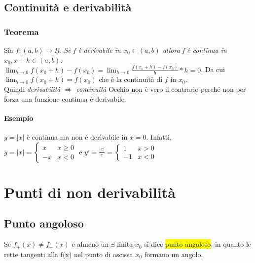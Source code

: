 \subsection{Continuità e derivabilità}
\subsubsection{Teorema}
Sia $f: (a,b) \to R$. \textit{Se f è derivabile in $x_0 \in (a,b)$ allora f è
continua in $x_0,x+h\in (a,b)$: $\lim_{h\to 0} f(x_0+h)-f(x_0)=\lim_{h\to
0}\frac{f(x_0+h)-f(x_0)}{h}*h=0$}.
Da cui $\lim_{h\to 0}f(x_0+h)=f(x_0)$ che è la continuità di $f$ in $x_0$.\\
Quindi \textit{\color{red} derivabilità $\Rightarrow$ continuità} Occhio non è
vero il contrario perché non per forza una funzione continua è derivabile.
\paragraph{Esempio} $y=|x|$ è continua ma non è derivabile in $x=0$.
Infatti,\\ $y=|x|=\begin{cases}
	x&x\geq 0\\
	-x&x<0
\end{cases} \text{ e } y^,=\frac{|x|}{x}=\begin{cases}
	1&x> 0\\
	-1&x<0
\end{cases}$
\section{Punti di non derivabilità}
\subsection{Punto angoloso}
Se $f^,_+(x)\neq f^,_-(x)$ e almeno un $\exists$ finita $x_0$ si dice
\colorbox{yellow}{punto
angoloso}, in quanto le rette tangenti alla f(x) nel punto di ascissa $x_0$
formano un angolo.
